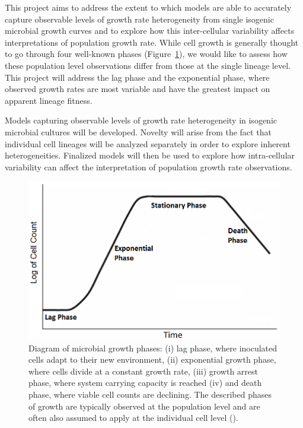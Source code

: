 \documentclass{bioinfo}
\begin{document}
This project aims to address the extent to which models are able to accurately capture observable levels of growth rate heterogeneity from single isogenic microbial growth curves and to explore how this inter-cellular variability affects interpretations of population growth rate. While cell growth is generally thought to go through four well-known phases (Figure~\ref{fig:GrowthPhases}), we would like to assess how these population level observations differ from those at the single lineage level. This project will address the lag phase and the exponential phase, where observed growth rates are most variable and have the greatest impact on apparent lineage fitness. 

Models capturing observable levels of growth rate heterogeneity in isogenic microbial cultures will be developed. Novelty will arise from the fact that individual cell lineages will be analyzed separately in order to explore inherent heterogeneities. Finalized models will then be used to explore how intra-cellular variability can affect the interpretation of population growth rate observations.

\vspace{+2em}
\begin{figure}[H]
\includegraphics[width=1\linewidth]{GrowthPhases.png}
\caption{Diagram of microbial growth phases: (i) lag phase, where inoculated cells adapt to their new environment, (ii) exponential growth phase, where cells divide at a constant growth rate, (iii) growth arrest phase, where system carrying capacity is reached (iv) and death phase, where viable cell counts are declining. The described phases of growth are typically observed at the population level and are often also assumed to apply at the individual cell level (\citealp{Baranyi02}).}
\label{fig:GrowthPhases}
\vspace{-3em}
\end{figure}
\end{document}
